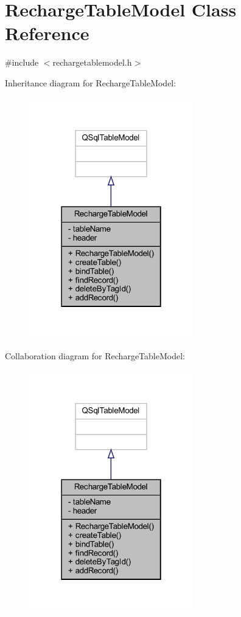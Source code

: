 \hypertarget{class_recharge_table_model}{}\section{Recharge\+Table\+Model Class Reference}
\label{class_recharge_table_model}


{\ttfamily \#include $<$rechargetablemodel.\+h$>$}



Inheritance diagram for Recharge\+Table\+Model\+:
\nopagebreak
\begin{figure}[H]
\begin{center}
\leavevmode
\includegraphics[width=202pt]{class_recharge_table_model__inherit__graph}
\end{center}
\end{figure}


Collaboration diagram for Recharge\+Table\+Model\+:
\nopagebreak
\begin{figure}[H]
\begin{center}
\leavevmode
\includegraphics[width=202pt]{class_recharge_table_model__coll__graph}
\end{center}
\end{figure}
